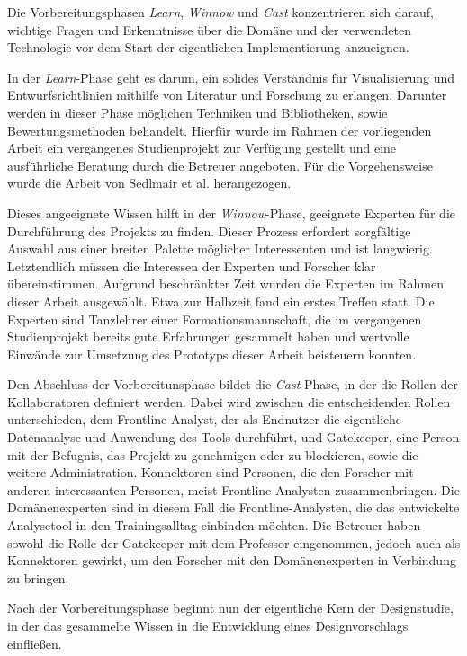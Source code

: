 \documentclass[
  ngerman,
  a4paper,  %
  twoside,  %
  bibliography=totoc,
  headsepline,
  cleardoublepage=empty,
  parskip=half,
  draft=false
]{scrbook}
\begin{document}
Die Vorbereitungsphasen \textit{Learn}, \textit{Winnow} und \textit{Cast} konzentrieren sich darauf, wichtige Fragen und Erkenntnisse über die Domäne und der verwendeten Technologie vor dem Start der eigentlichen Implementierung anzueignen.

In der \textit{Learn}-Phase geht es darum, ein solides Verständnis für Visualisierung und Entwurfsrichtlinien mithilfe von Literatur und Forschung zu erlangen. Darunter werden in dieser Phase möglichen Techniken und Bibliotheken, sowie Bewertungsmethoden behandelt. Hierfür wurde im Rahmen der vorliegenden Arbeit ein vergangenes Studienprojekt zur Verfügung gestellt und eine ausführliche Beratung durch die Betreuer angeboten. Für die Vorgehensweise wurde die Arbeit von Sedlmair et al. \cite{sedlmair_design_2012} herangezogen.

Dieses angeeignete Wissen hilft in der \textit{Winnow}-Phase, geeignete Experten für die Durchführung des Projekts zu finden. Dieser Prozess erfordert sorgfältige Auswahl aus einer breiten Palette möglicher Interessenten und ist langwierig. Letztendlich müssen die Interessen der Experten und Forscher klar übereinstimmen. Aufgrund beschränkter Zeit wurden die Experten im Rahmen dieser Arbeit ausgewählt. Etwa zur Halbzeit fand ein erstes Treffen statt. Die Experten sind Tanzlehrer einer Formationsmannschaft, die im vergangenen Studienprojekt bereits gute Erfahrungen gesammelt haben und wertvolle Einwände zur Umsetzung des Prototyps dieser Arbeit beisteuern konnten.

Den Abschluss der Vorbereitunsphase bildet die \textit{Cast}-Phase, in der die Rollen der Kollaboratoren definiert werden. Dabei wird zwischen die entscheidenden Rollen unterschieden, dem Frontline-Analyst, der als Endnutzer die eigentliche Datenanalyse und Anwendung des Tools durchführt, und Gatekeeper, eine Person mit der Befugnis, das Projekt zu genehmigen oder zu blockieren, sowie die weitere Administration. Konnektoren sind Personen, die den Forscher mit anderen interessanten Personen, meist Frontline-Analysten zusammenbringen. Die Domänenexperten sind in diesem Fall die Frontline-Analysten, die das entwickelte Analysetool in den Trainingsalltag einbinden möchten. Die Betreuer haben sowohl die Rolle der Gatekeeper mit dem Professor eingenommen, jedoch auch als Konnektoren gewirkt, um den Forscher mit den Domänenexperten in Verbindung zu bringen.

Nach der Vorbereitungsphase beginnt nun der eigentliche Kern der Designstudie, in der das gesammelte Wissen in die Entwicklung eines Designvorschlags einfließen.
\end{document}
